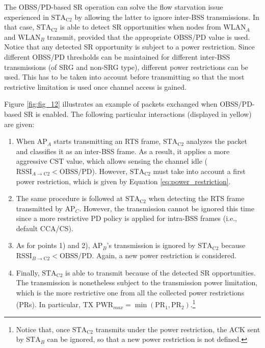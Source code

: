 \documentclass[preprint,12pt]{elsarticle}
\begin{document}
	The OBSS/PD-based SR operation can solve the flow starvation issue experienced in $\text{STA}_\text{C2}$ by allowing the latter to ignore inter-BSS transmissions. In that case, $\text{STA}_\text{C2}$ is able to detect SR opportunities when nodes from $\text{WLAN}_A$ and $\text{WLAN}_B$ transmit, provided that the appropriate OBSS/PD value is used. Notice that any detected SR opportunity is subject to a power restriction. Since different OBSS/PD thresholds can be maintained for different inter-BSS transmissions (of SRG and non-SRG type), different power restrictions can be used. This has to be taken into account before transmitting so that the most restrictive limitation is used once channel access is gained.
	
	Figure \ref{fig:fig_12} illustrates an example of packets exchanged when OBSS/PD-based SR is enabled. The following particular interactions (displayed in yellow) are given:
	\begin{enumerate}
		\item When $\text{AP}_A$ starts transmitting an RTS frame, $\text{STA}_\text{C2}$ analyzes the packet and classifies it as an inter-BSS frame. As a result, it applies a more aggressive CST value, which allows sensing the channel idle ($\text{RSSI}_{A \rightarrow \text{C2}} < \text{OBSS/PD}$). However, $\text{STA}_\text{C2}$ must take into account a first power restriction, which is given by Equation \eqref{eq:power_restriction}.
		\item The same procedure is followed at $\text{STA}_\text{C2}$ when detecting the RTS frame transmitted by $\text{AP}_C$. However, the transmission cannot be ignored this time since a more restrictive PD policy is applied for intra-BSS frames (i.e., default CCA/CS).
		\item As for points 1) and 2), $\text{AP}_B$'s transmission is ignored by $\text{STA}_\text{C2}$ because $\text{RSSI}_{B \rightarrow \text{C2}} < \text{OBSS/PD}$. Again, a new power restriction is considered.
		\item Finally, $\text{STA}_\text{C2}$ is able to transmit because of the detected SR opportunities. The transmission is nonetheless subject to the transmission power limitation, which is the more restrictive one from all the collected power restrictions (PRs). In particular, $\text{TX PWR}_{max} = \min(\text{PR}_1, \text{PR}_2)$.\footnote{Notice that, once $\text{STA}_\text{C2}$ transmits under the power restriction, the ACK sent by $\text{STA}_B$ can be ignored, so that a new power restriction is not defined.}
	\end{enumerate}
	
\end{document}
